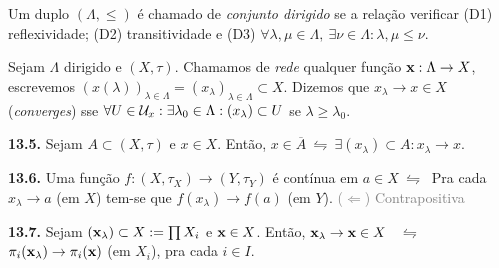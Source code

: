 \begin{definition}
    Um duplo \((\Lambda, \leq)\) é chamado de \emph{conjunto dirigido} se a relação verificar (D1) reflexividade; (D2) transitividade e (D3) \(\forall \lambda, \mu \in \Lambda, \ \exists \nu \in \Lambda : \lambda, \mu \leq \nu\).
\end{definition}

\begin{definition}
    Sejam \(\Lambda\) dirigido e \((X, \tau)\). Chamamos de \emph{rede} qualquer função \(\textbf{x} : \Lambda \to X\), escrevemos \( (x(\lambda))_{\lambda\in \Lambda} = (x_\lambda)_{\lambda \in \Lambda} \subset X\). Dizemos que \(x_\lambda \to x \in X\) (\emph{converges}) sse \(\forall U \in \mathcal{U}_x: \exists \lambda_0 \in \Lambda : (x_\lambda) \subset U\) se \(\lambda \geq \lambda_0\).  
\end{definition}


\begin{proposition}
    \textbf{13.5.} Sejam \(A \subset (X, \tau)\) e \(x \in X\). Então, \(x \in \overline{A} \ \leftrightharpoons \ \exists (x_\lambda)\subset A : x_\lambda \to x\). 
\end{proposition}

\hypertarget{prop136}{}
\begin{proposition}
    \textbf{13.6.} Uma função \(f : (X, \tau_X) \to (Y, \tau_Y)\) é contínua em \(a \in X \ \leftrightharpoons \ \) Pra cada \(x_\lambda \to a\) (em \(X\)) tem-se que \(f(x_\lambda) \to f(a)\) (em \(Y\)). \textcolor{gray}{(\(\Leftarrow\)) Contrapositiva}
\end{proposition}

\hypertarget{prop137}{}
\begin{proposition}
    \textbf{13.7.} Sejam \((\textbf{x}_\lambda) \subset X := \prod X_i\) e \(\textbf{x} \in X\). Então, \(\textbf{x}_\lambda \to \textbf{x} \in X\) \ \(\leftrightharpoons\) \ \(\pi_i(\textbf{x}_\lambda) \to \pi_i(\textbf{x})\) (em \( X_i\)), pra cada \(i \in I\).
\end{proposition}


